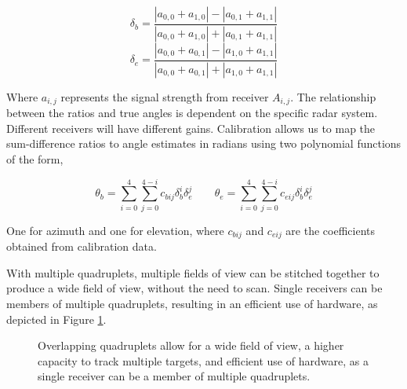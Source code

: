 \begin{equation}
    \delta_b = \frac{|a_{0,0} + a_{1,0}| - |a_{0,1} + a_{1,1}|}{|a_{0,0} + a_{1,0}| + |a_{0,1} + a_{1,1}|}
\end{equation}
\begin{equation}
    \delta_e = \frac{|a_{0,0} + a_{0,1}| - |a_{1,0} + a_{1,1}|}{|a_{0,0} + a_{0,1}| + |a_{1,0} + a_{1,1}|}
\end{equation}

Where \(a_{i,j}\) represents the signal strength from receiver \(A_{i,j}\). The relationship between 
the ratios and true angles is dependent on the specific radar system. 
Different receivers will have different gains. Calibration allows us to map the sum-difference ratios
to angle estimates in radians using two polynomial functions of the form,

\begin{equation}
    \theta_b = \sum_{i=0}^{4} \sum_{j=0}^{4-i} c_{bij} \delta_b^i \delta_e^j
    \qquad
    \theta_e = \sum_{i=0}^{4} \sum_{j=0}^{4-i} c_{eij} \delta_b^i \delta_e^j
\end{equation}

One for azimuth and one for elevation, where \(c_{bij}\) and \(c_{eij}\) are the coefficients 
obtained from calibration data.

With multiple quadruplets, multiple fields of view can be stitched together to produce a wide field of view, 
without the need to scan. Single receivers can be members of multiple quadruplets, resulting in an efficient 
use of hardware, as 
depicted in Figure \ref{fig:overlapping_quadruplets}. 
\begin{figure}
    \caption[Overlapping quadruplets.]{Overlapping quadruplets allow for a wide field of view, a higher capacity
    to track multiple targets, and efficient use of hardware, as a single receiver can be a member of 
    multiple quadruplets.}
    \label{fig:overlapping_quadruplets}
\end{figure}